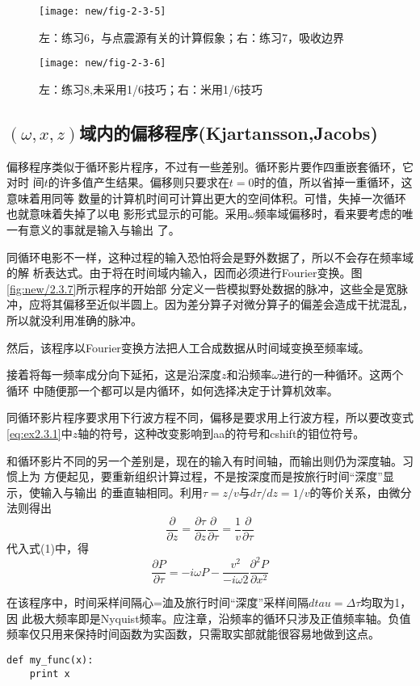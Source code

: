 \begin{figure}[H]
\centering
\texttt{[image: new/fig-2-3-5]}
\caption[2-3-5]{左：练习6，与点震源有关的计算假象；右：练习7，吸收边界}
\label{fig:new/fig-2-3-5}
\end{figure}

\begin{figure}[H]
\centering
\texttt{[image: new/fig-2-3-6]}
\caption[2-3-6]{左：练习8,未采用1/6技巧；右：米用1/6技巧}
\label{fig:new/fig-2-3-6}
\end{figure}

\subsection{$(\omega,x,z)$域内的偏移程序(Kjartansson,Jacobs)}
偏移程序类似于循环影片程序，不过有一些差别。循环影片要作四重嵌套循环，它对时
间$t$的许多值产生结果。偏移则只要求在$t=0$时的值，所以省掉一重循环，这意味着用同等
数量的计算机时间可计算出更大的空间体积。可惜，失掉一次循环也就意味着失掉了以电
影形式显示的可能。采用$\omega$频率域偏移时，看来要考虑的唯一有意义的事就是输入与输出
了。

同循环电影不一样，这种过程的输入恐怕将会是野外数据了，所以不会存在频率域的解
析表达式。由于将在时间域内输入，因而必须进行Fourier变换。图\ref{fig:new/2.3.7}所示程序的开始部
分定义一呰模拟野处数据的脉冲，这些全是宽脉冲，应将其偏移至近似半圆上。因为差分算子对微分算子的偏差会造成干扰混乱，所以就没利用准确的脉冲。

然后，该程序以Fourier变换方法把人工合成数据从时间域变换至频率域。

接着将每一频率成分向下延拓，这是沿深度$z$和沿频率$\omega$进行的一种循环。这两个循环
中随便那一个都可以是内循环，如何选择决定于计算机效率。

同循环影片程序要求用下行波方程不同，偏移是要求用上行波方程，所以要改变式
\ref{eq:ex2.3.1}中$z$轴的符号，这种改变影响到aa的符号和cshift的钼位符号。

和循环影片不同的另一个差别是，现在的输入有时间轴，而输出则仍为深度轴。习惯上为
方便起见，要重新组织计算过程，不是按深度而是按旅行时间“深度”显示，使输入与输出
的垂直轴相同。利用$\tau=z/v$与$d\tau/dz=1/v$的等价关系，由微分法则得出
\begin{equation}
\frac{\partial}{\partial z}=\frac{\partial\tau}{\partial z}\frac{\partial}{\partial \tau}=\frac{1}{v}\frac{\partial}{\partial \tau}
\label{eq:2.3.7}
\end{equation}
代入式(1)中，得
\begin{equation}
\frac{\partial P}{\partial \tau}= -i\omega P-\frac{v^2}{-i\omega 2}\frac{\partial^2 P}{\partial x^2}
\label{eq:2.3.8}
\end{equation}

在该程序中，时间采样间隔心=洫及旅行时间“深度”采样间隔$dtau=\Delta\tau$均取为1，因
此极大频率即是Nyquist频率。应注章，沿频率的循环只涉及正值频率轴。负值频率仅只用来保持时间函数为实函数，只需取实部就能很容易地做到这点。

\begin{code}
\begin{verbatim}
def my_func(x):
    print x
\end{verbatim}
\label{lst:my_func}
\end{code}

